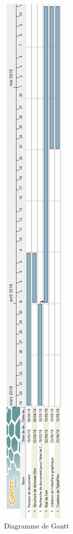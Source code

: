 \documentclass{article}
\begin{document}
\newpage
\begin{figure}[!h]
    \centering
    \includegraphics[scale=0.25]{Projet_c_rotateLeft.png}
    \caption{Diagramme de Gantt}
\end{figure}
\newpage
\end{document}
